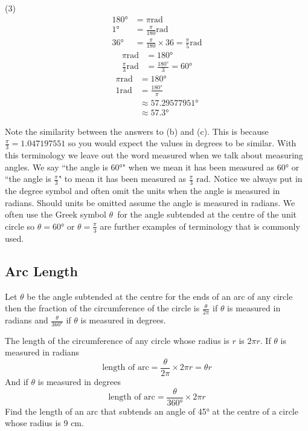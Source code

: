 \solution \begin{tasks}[before-skip = {0ex} , after-skip={-5ex}](3)
\task \begin{align*}\ang{180}  &  =  \pi \text{}\mbox{rad} \\
\ang{1}  &  =  \frac{\pi }{180}\text{}\mbox{rad} \\
\ang{36}  &  =  \frac{\pi }{180} \times 36 =\frac{\pi }{5}\text{}\mbox{rad}\end{align*}
\task
\begin{align*}\pi  \mbox{rad} &  =  \ang{180}  \\
\frac{\pi }{3} \mbox{rad} &  = \frac{\ang{180} }{3} =\ang{60} \end{align*}
\task
\begin{align*}\pi  \mbox{rad} &  =  \ang{180} \\
1 \mbox{rad} &  =  \frac{\ang{180} }{\pi } \\
 &  \approx   \ang{57.29577951}  \\
 &  \approx   \ang{57.3} \end{align*}
\end{tasks}
Note the similarity between the answers to (b) and (c). This is because $\frac{\pi }{3} =1.047197551$ so you would expect the values in degrees to be similar.  With this terminology we leave out the word measured when we talk about measuring angles. We say ``the angle is $\ang{60} $" when we mean it has been measured as $\ang{60} $ or ``the angle is $\frac{\pi }{3}$" to mean it has been measured as $\frac{\pi }{3}$ $\mbox{rad}$. Notice we always put in the degree symbol and often omit the units when the angle is measured in radians. Should units be omitted assume the angle is measured in radians. We often use the Greek symbol $\theta $\ for the angle subtended at the centre of the unit circle so $\theta  =\ang{60} $ or $\theta  =\frac{\pi }{3}$ are further examples of terminology that is commonly used.

\subsection*{Arc Length}
Let $\theta $ be the angle subtended at the centre for the ends of an arc of any circle then the fraction of the circumference of the circle is $\frac{\theta }{2 \pi }$ if $\theta $ is measured in radians and $\frac{\theta }{\ang{360}}$ if $\theta $ is measured in degrees. 

The length of the circumference of any circle whose radius is $r$ is $2 \pi  r$. If $\theta $ is measured in radians
\begin{equation*}\text{length of arc} =\frac{\theta }{2 \pi } \times 2 \pi  r =\theta  r
\end{equation*}
And if $\theta $ is measured in degrees
\begin{equation*}\text{length of arc} =\frac{\theta }{\ang{360}} \times 2 \pi  r
\end{equation*}
\example Find the length of an arc that subtends an angle of \ang{45} at the centre of a circle whose radius is 9 cm. 

